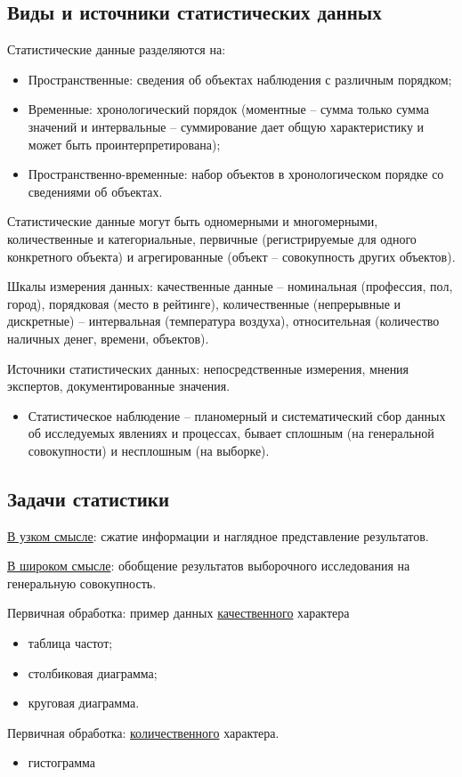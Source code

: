     \subsection*{Виды и источники статистических данных}
    Статистические данные разделяются на:
    \begin{itemize}
        \item Пространственные: сведения об объектах наблюдения с различным порядком;
        \item Временные: хронологический порядок (моментные -- сумма только сумма значений и интервальные -- суммирование дает общую характеристику и может быть проинтерпретирована);
        \item Пространственно-временные: набор объектов в хронологическом порядке со сведениями об объектах. 
    \end{itemize}
    Статистические данные могут быть одномерными и многомерными, количественные и категориальные, первичные (регистрируемые для одного конкретного объекта) и агрегированные (объект -- совокупность других объектов). 
    \par 
    Шкалы измерения данных: качественные данные -- номинальная (профессия, пол, город), порядковая (место в рейтинге), количественные (непрерывные и дискретные) -- интервальная (температура воздуха), относительная (количество наличных денег, времени, объектов).
    \par 
    Источники статистических данных: непосредственные измерения, мнения экспертов, документированные значения.
    \begin{itemize}
        \item Статистическое наблюдение -- планомерный и систематический сбор данных об исследуемых явлениях и процессах, бывает сплошным (на генеральной совокупности) и несплошным (на выборке).
    \end{itemize}
    \subsection*{Задачи статистики}
    
    \par 
    \underline{В узком смысле}: сжатие информации и наглядное представление результатов.
    \par
    \underline{В широком смысле}: обобщение результатов выборочного исследования на генеральную совокупность.
    \par
    Первичная обработка: пример данных \underline{качественного} характера
    \begin{itemize}
        \item таблица частот;
        \item столбиковая диаграмма;
        \item круговая диаграмма.
    \end{itemize}
    \par
    Первичная обработка: \underline{количественного} характера. \begin{itemize}
        \item гистограмма
    \end{itemize}
